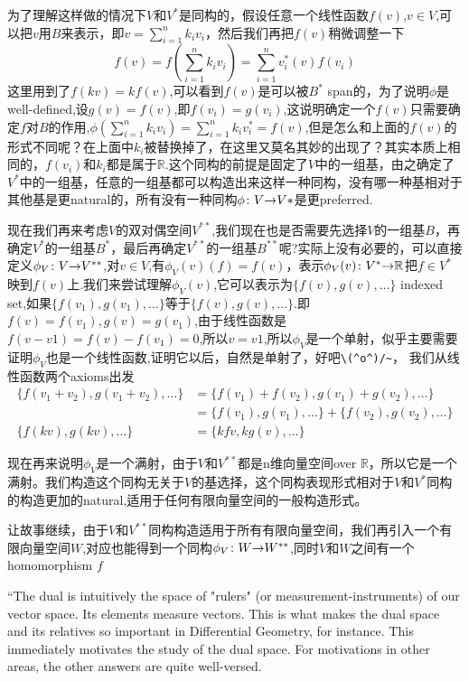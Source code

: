 \documentclass[UTF8,11pt,a4paper]{ctexart}%
\begin{document}
为了理解这样做的情况下$V$和$V^{*}$是同构的，假设任意一个线性函数$f(v)$,$v \in V$,可以把$v$用$B$来表示，即$v=\sum\limits_{i=1}^{n}{k_iv_i}$，然后我们再把$f(v)$稍微调整一下\[f(v)=f\left(\sum\limits_{i=1}^{n}{k_iv_i}\right)=\sum\limits_{i=1}^{n}{v_i^{*}(v)f(v_i)}\]这里用到了$f(kv)=kf(v)$,可以看到$f(v)$是可以被$B^*$ span的，为了说明$\phi$是well-defined,设$g(v)=f(v)$,即$f(v_i)=g(v_i)$,这说明确定一个$f(v)$只需要确定$f$对$B$的作用,$\phi(\sum\limits_{i=1}^{n}{k_iv_i})=\sum\limits_{i=1}^{n}{k_iv_i^{*}}=f(v)$,但是怎么和上面的$f(v)$的形式不同呢？在上面中$k_i$被替换掉了，在这里又莫名其妙的出现了？其实本质上相同的，$f(v_i)$和$k_i$都是属于$\mathbb{R}$.这个同构的前提是固定了$V$中的一组基，由之确定了$V^{*}$中的一组基，任意的一组基都可以构造出来这样一种同构，没有哪一种基相对于其他基是更natural的，所有没有一种同构${\phi}\colon{V}{\to}{V*}$是更preferred.

现在我们再来考虑$V$的双对偶空间$V^{**}$,我们现在也是否需要先选择$V$的一组基$B$，再确定$V^{*}$的一组基$B^{*}$，最后再确定$V^{**}$的一组基$B^{**}$呢?实际上没有必要的，可以直接定义${\phi_{V}}\colon{V}{\to}{V^{**}}$,对$v \in V$,有$\phi_{V}(v)(f)=f(v)$，表示${\phi_{V}(v)}\colon{V^*}{\to}{\mathbb{R}}$把$f \in V^{*}$映到$f(v)$上.我们来尝试理解$\phi_{V}(v)$,它可以表示为$\{f(v),g(v),\ldots\}$ indexed set,如果$\{f(v_1),g(v_1),\ldots\}$等于$\{f(v),g(v),\ldots\}$.即$f(v)=f(v_1),g(v)=g(v_1)$,由于线性函数是$f(v-v1)=f(v)-f(v_1)=0$,所以$v=v1$,所以$\phi_{V}$是一个单射，似乎主要需要证明$\phi_{V}$也是一个线性函数,证明它以后，自然是单射了，好吧\verb|\(^o^)/~|， 我们从线性函数两个axioms出发
	\begin{align*}
		\{f(v_1+v_2),g(v_1+v_2),\ldots\}& =\{f(v_1)+f(v_2),g(v_1)+g(v_2),\ldots\} \\ 
		&=\{f(v_1),g(v_1),\ldots\}+\{f(v_2),g(v_2),\ldots\}\\
		\{f(kv),g(kv),\ldots\} &= \{kf{v},kg(v),\ldots\}	
	\end{align*}

现在再来说明$\phi_{V}$是一个满射，由于$V$和$V^{**}$都是n维向量空间over $\mathbb{R}$，所以它是一个满射。我们构造这个同构无关于$V$的基选择，这个同构表现形式相对于$V$和$V^{*}$同构的构造更加的natural,适用于任何有限向量空间的一般构造形式。


让故事继续，由于$V$和$V^{**}$同构构造适用于所有有限向量空间，我们再引入一个有限向量空间$W$,对应也能得到一个同构${\phi_{V}}\colon{W}{\to}{W^{**}}$,同时$V$和$W$之间有一个homomorphism $f$


``The dual is intuitively the space of "rulers" (or measurement-instruments) of our vector space. Its elements measure vectors. This is what makes the dual space and its relatives so important in Differential Geometry, for instance. This immediately motivates the study of the dual space. For motivations in other areas, the other answers are quite well-versed.
\end{document}
